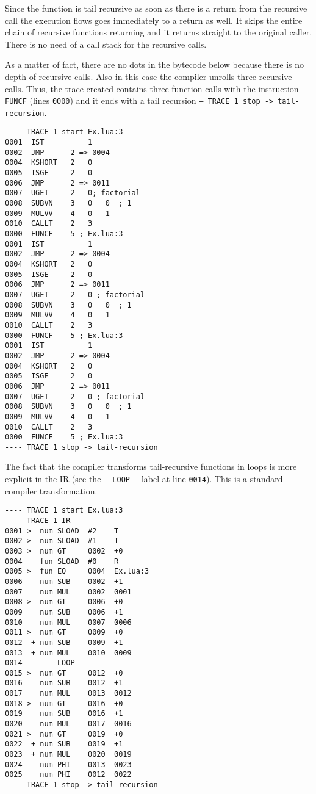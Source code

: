 \noindent
Since the function is tail recursive as soon as there is a return from the recursive call the execution flows goes immediately to a return as well. It skips the entire chain of recursive functions returning and it returns straight to the original caller. There is no need of a call stack for the recursive calls.

As a matter of fact, there are no dots in the bytecode below because there is no depth of recursive calls. Also in this case the compiler unrolls three recursive calls. Thus, the trace created contains three function calls with the instruction \texttt{FUNCF} (lines \texttt{0000}) and it ends with a tail recursion \texttt{-- TRACE 1 stop -> tail-recursion}.

\begin{multicols}{2}
\begin{lstlisting}[style=DumpStyle]
---- TRACE 1 start Ex.lua:3
0001  IST          1
0002  JMP      2 => 0004
0004  KSHORT   2   0
0005  ISGE     2   0
0006  JMP      2 => 0011
0007  UGET     2   0; factorial
0008  SUBVN    3   0   0  ; 1
0009  MULVV    4   0   1
0010  CALLT    2   3
0000  FUNCF    5 ; Ex.lua:3
0001  IST          1
0002  JMP      2 => 0004
0004  KSHORT   2   0
0005  ISGE     2   0
0006  JMP      2 => 0011
0007  UGET     2   0 ; factorial
0008  SUBVN    3   0   0  ; 1
0009  MULVV    4   0   1
0010  CALLT    2   3
0000  FUNCF    5 ; Ex.lua:3
0001  IST          1
0002  JMP      2 => 0004
0004  KSHORT   2   0
0005  ISGE     2   0
0006  JMP      2 => 0011
0007  UGET     2   0 ; factorial
0008  SUBVN    3   0   0  ; 1
0009  MULVV    4   0   1
0010  CALLT    2   3
0000  FUNCF    5 ; Ex.lua:3
---- TRACE 1 stop -> tail-recursion
\end{lstlisting}
\end{multicols}

\noindent
The fact that the compiler transforms tail-recursive functions in loops is more explicit in the IR (see the \texttt{-- LOOP --} label at line \texttt{0014}). This is a standard compiler transformation.

\begin{multicols}{2}
\begin{lstlisting}[style=DumpStyle]
---- TRACE 1 start Ex.lua:3
---- TRACE 1 IR
0001 >  num SLOAD  #2    T
0002 >  num SLOAD  #1    T
0003 >  num GT     0002  +0  
0004    fun SLOAD  #0    R
0005 >  fun EQ     0004  Ex.lua:3
0006    num SUB    0002  +1  
0007    num MUL    0002  0001
0008 >  num GT     0006  +0  
0009    num SUB    0006  +1  
0010    num MUL    0007  0006
0011 >  num GT     0009  +0  
0012  + num SUB    0009  +1  
0013  + num MUL    0010  0009
0014 ------ LOOP ------------
0015 >  num GT     0012  +0  
0016    num SUB    0012  +1  
0017    num MUL    0013  0012
0018 >  num GT     0016  +0  
0019    num SUB    0016  +1  
0020    num MUL    0017  0016
0021 >  num GT     0019  +0  
0022  + num SUB    0019  +1  
0023  + num MUL    0020  0019
0024    num PHI    0013  0023
0025    num PHI    0012  0022
---- TRACE 1 stop -> tail-recursion
\end{lstlisting}
\end{multicols}


